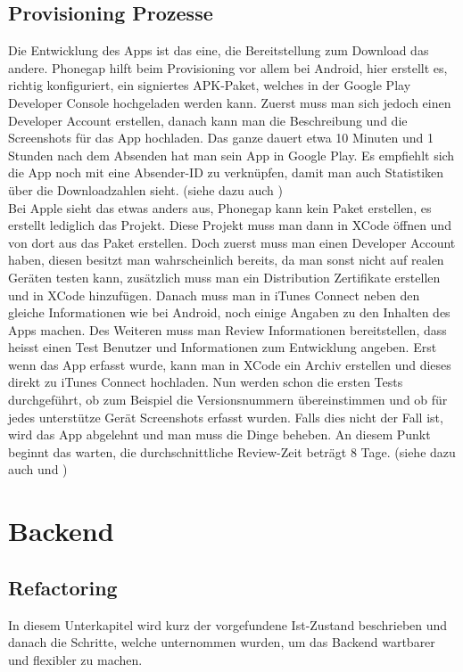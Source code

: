 \subsection{Provisioning Prozesse}
Die Entwicklung des Apps ist das eine, die Bereitstellung zum Download das andere. Phonegap hilft beim Provisioning vor allem bei Android, hier erstellt es, richtig konfiguriert, ein signiertes APK-Paket, welches in der Google Play Developer Console hochgeladen werden kann. Zuerst muss man sich jedoch einen Developer Account erstellen, danach kann man die Beschreibung und die Screenshots für das App hochladen. Das ganze dauert etwa 10 Minuten und 1 Stunden nach dem Absenden hat man sein App in Google Play. Es empfiehlt sich die App noch mit eine Absender-ID zu verknüpfen, damit man auch Statistiken über die Downloadzahlen sieht. (siehe dazu auch \cite{android_prov})\\
Bei Apple sieht das etwas anders aus, Phonegap kann kein Paket erstellen, es erstellt lediglich das Projekt. Diese Projekt muss man dann in XCode öffnen und von dort aus das Paket erstellen. Doch zuerst muss man einen Developer Account haben, diesen besitzt man wahrscheinlich bereits, da man sonst nicht auf realen Geräten testen kann, zusätzlich muss man ein Distribution Zertifikate erstellen und in XCode hinzufügen. Danach muss man in iTunes Connect neben den gleiche Informationen wie bei Android, noch einige Angaben zu den Inhalten des Apps machen. Des Weiteren muss man Review Informationen bereitstellen, dass heisst einen Test Benutzer und Informationen zum Entwicklung angeben. Erst wenn das App erfasst wurde, kann man in XCode ein Archiv erstellen und dieses direkt zu iTunes Connect hochladen. Nun werden schon die ersten Tests durchgeführt, ob zum Beispiel die Versionsnummern übereinstimmen und ob für jedes unterstütze Gerät Screenshots erfasst wurden. Falls dies nicht der Fall ist, wird das App abgelehnt und man muss die Dinge beheben. An diesem Punkt beginnt das warten, die durchschnittliche Review-Zeit beträgt 8 Tage. (siehe dazu auch \cite{apple_prov_apple} und \cite{apple_prov_ralf})

\FloatBarrier
\section{Backend}\label{impl_backend}

\subsection{Refactoring}
In diesem Unterkapitel wird kurz der vorgefundene Ist-Zustand beschrieben und danach die Schritte, welche unternommen wurden, um das Backend wartbarer und flexibler zu machen.

